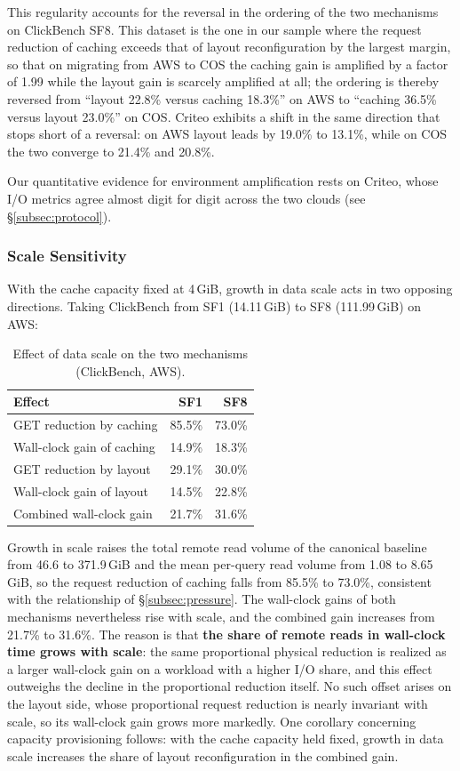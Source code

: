 This regularity accounts for the reversal in the ordering of the two mechanisms
on ClickBench SF8. This dataset is the one in our sample where the request
reduction of caching exceeds that of layout reconfiguration by the largest
margin, so that on migrating from AWS to COS the caching gain is amplified by a
factor of 1.99 while the layout gain is scarcely amplified at all; the ordering
is thereby reversed from ``layout 22.8\% versus caching 18.3\%'' on AWS to
``caching 36.5\% versus layout 23.0\%'' on COS. Criteo exhibits a shift in the
same direction that stops short of a reversal: on AWS layout leads by 19.0\% to
13.1\%, while on COS the two converge to 21.4\% and 20.8\%.

Our quantitative evidence for environment amplification rests on Criteo, whose
I/O metrics agree almost digit for digit across the two clouds (see
\S\ref{subsec:protocol}).

\subsubsection{Scale Sensitivity}
\label{subsec:scale}

With the cache capacity fixed at 4\,GiB, growth in data scale acts in two
opposing directions. Taking ClickBench from SF1 (14.11\,GiB) to SF8
(111.99\,GiB) on AWS:

\begin{table}[t]
\centering
\caption{Effect of data scale on the two mechanisms (ClickBench, AWS).}
\label{tab:scale}
\footnotesize
\begin{tabular}{@{}lrr@{}}
\toprule
Effect & SF1 & SF8 \\
\midrule
GET reduction by caching   & 85.5\% & 73.0\% \\
Wall-clock gain of caching & 14.9\% & 18.3\% \\
GET reduction by layout    & 29.1\% & 30.0\% \\
Wall-clock gain of layout  & 14.5\% & 22.8\% \\
Combined wall-clock gain   & 21.7\% & 31.6\% \\
\bottomrule
\end{tabular}
\end{table}

Growth in scale raises the total remote read volume of the canonical baseline
from 46.6 to 371.9\,GiB and the mean per-query read volume from 1.08 to
8.65\,GiB, so the request reduction of caching falls from 85.5\% to 73.0\%,
consistent with the relationship of \S\ref{subsec:pressure}. The wall-clock
gains of both mechanisms nevertheless rise with scale, and the combined gain
increases from 21.7\% to 31.6\%. The reason is that \textbf{the share of remote
reads in wall-clock time grows with scale}: the same proportional physical
reduction is realized as a larger wall-clock gain on a workload with a higher
I/O share, and this effect outweighs the decline in the proportional reduction
itself. No such offset arises on the layout side, whose proportional request
reduction is nearly invariant with scale, so its wall-clock gain grows more
markedly. One corollary concerning capacity provisioning follows: with the cache
capacity held fixed, growth in data scale increases the share of layout
reconfiguration in the combined gain.

